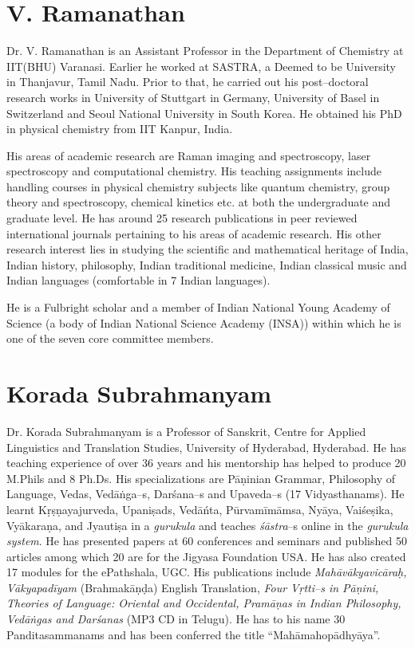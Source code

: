 \section*{V. Ramanathan}

Dr. V. Ramanathan is an Assistant Professor in the Department of Chemistry at IIT(BHU) Varanasi. Earlier he worked at SASTRA, a Deemed to be University in Thanjavur, Tamil Nadu. Prior to that, he carried out his post–doctoral research works in University of Stuttgart in Germany, University of Basel in Switzerland and Seoul National University in South Korea. He obtained his PhD in physical chemistry from IIT Kanpur, India.

His areas of academic research are Raman imaging and spectroscopy, laser spectroscopy and computational chemistry. His teaching assignments include handling courses in physical chemistry subjects like quantum chemistry, group theory and spectroscopy, chemical kinetics etc. at both the undergraduate and graduate level. He has around 25 research publications in peer reviewed international journals pertaining to his areas of academic research. His other research interest lies in studying the scientific and mathematical heritage of India, Indian history, philosophy, Indian traditional medicine, Indian classical music and Indian languages (comfortable in 7 Indian languages).

He is a Fulbright scholar and a member of Indian National Young Academy of Science (a body of Indian National Science Academy (INSA)) within which he is one of the seven core committee members.


\section*{Korada Subrahmanyam }

Dr. Korada Subrahmanyam is a Professor of Sanskrit, Centre for Applied Linguistics and Translation Studies, University of Hyderabad, Hyderabad. He has teaching experience of over 36 years and his mentorship has helped to produce 20 M.Phils and 8 Ph.Ds. His specializations are Pāṇinian Grammar, Philosophy of Language, Vedas, Vedāṅga–s, Darśana–s and Upaveda–s (17 Vidyasthanams). He learnt Kṛṣṇayajurveda, Upaniṣads, Vedāńta, Pūrvamīmāmsa, Nyāya, Vaiśeṣika, Vyākaraṇa, and Jyautiṣa in a \textit{gurukula} and teaches \textit{śāstra}–s online in the \textit{gurukula system}. He has presented papers at 60 conferences and seminars and published 50 articles among which 20 are for the Jigyasa Foundation USA. He has also created 17 modules for the ePathshala, UGC. His publications include \textit{Mahāvākyavicāraḥ, Vākyapadīyam} (Brahmakāṇḍa) English Translation, \textit{Four Vṛtti–s in Pāṇini, Theories of Language: Oriental and Occidental, Pramāṇas in Indian Philosophy, Vedāṅgas and Darśanas} (MP3 CD in Telugu). He has to his name 30 Panditasammanams and has been conferred the title “Mahāmahopādhyāya”.

